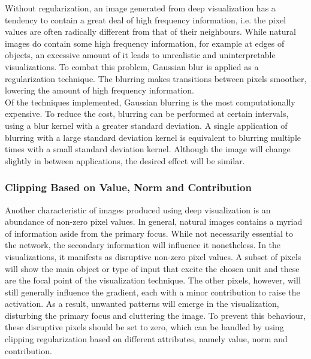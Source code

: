 Without regularization, an image generated from deep visualization has a tendency to contain a great deal of high frequency information, i.e. the pixel values are often radically different from that of their neighbours. While natural images do contain some high frequency information, for example at edges of objects, an excessive amount of it leads to unrealistic and uninterpretable visualizations. To combat this problem, Gaussian blur is applied as a regularization technique. The blurring makes transitions between pixels smoother, lowering the amount of high frequency information. \\

\noindent Of the techniques implemented, Gaussian blurring is the most computationally expensive. To reduce the cost, blurring can be performed at certain intervals, using a blur kernel with a greater standard deviation. A single application of blurring with a large standard deviation kernel is equivalent to blurring multiple times with a small standard deviation kernel. Although the image will change slightly in between applications, the desired effect will be similar. 

\subsubsection{Clipping Based on Value, Norm and Contribution}

Another characteristic of images produced using deep visualization is an abundance of non-zero pixel values. In general, natural images contains a myriad of information aside from the primary focus. While not necessarily essential to the network, the secondary information will influence it nonetheless. In the visualizations, it manifests as disruptive non-zero pixel values. A subset of pixels will show the main object or type of input that excite the chosen unit and these are the focal point of the visualization technique. The other pixels, however, will still generally influence the gradient, each with a minor contribution to raise the activation. As a result, unwanted patterns will emerge in the visualization, disturbing the primary focus and cluttering the image. To prevent this behaviour, these disruptive pixels should be set to zero, which can be handled by using clipping regularization based on different attributes, namely value, norm and contribution. \\

